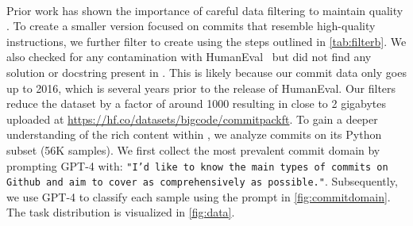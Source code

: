 \paragraph{\dataft{}} Prior work has shown the importance of careful data filtering to maintain quality \citep{yin2018mining,dhole2021nl,laurenccon2022bigscience,longpre2023pretrainer}. To create a smaller version focused on commits that resemble high-quality instructions, we further filter \data{} to create \dataft{} using the steps outlined in \autoref{tab:filterb}. We also checked for any contamination with HumanEval~\citep{chen2021evaluating} but did not find any solution or docstring present in \dataft{}. This is likely because our commit data only goes up to 2016, which is several years prior to the release of HumanEval. Our filters reduce the dataset by a factor of around 1000 resulting in close to 2 gigabytes uploaded at \url{https://hf.co/datasets/bigcode/commitpackft}. To gain a deeper understanding of the rich content within \dataft{}, we analyze commits on its Python subset (56K samples). We first collect the most prevalent commit domain by prompting GPT-4 with: \texttt{"I'd like to know the main types of commits on Github and aim to cover as comprehensively as possible."}. Subsequently, we use GPT-4 to classify each sample using the prompt in \autoref{fig:commitdomain}. The task distribution is visualized in \autoref{fig:data}.


